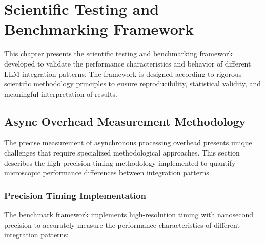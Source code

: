 \chapter{Scientific Testing and Benchmarking Framework}

This chapter presents the scientific testing and benchmarking framework developed to validate the performance characteristics and behavior of different LLM integration patterns. The framework is designed according to rigorous scientific methodology principles to ensure reproducibility, statistical validity, and meaningful interpretation of results.

\section{Async Overhead Measurement Methodology}

The precise measurement of asynchronous processing overhead presents unique challenges that require specialized methodological approaches. This section describes the high-precision timing methodology implemented to quantify microscopic performance differences between integration patterns.

\subsection{Precision Timing Implementation}

The benchmark framework implements high-resolution timing with nanosecond precision to accurately measure the performance characteristics of different integration patterns:


